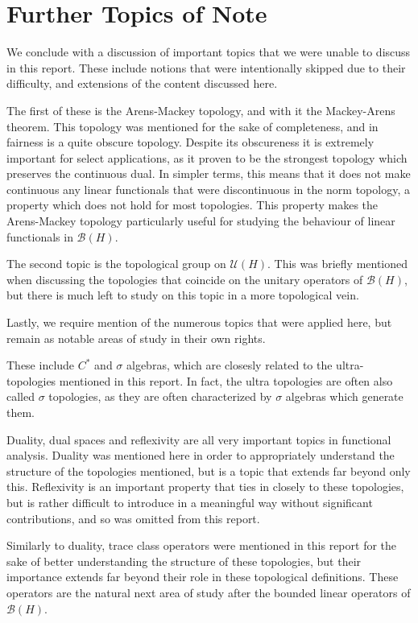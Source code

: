 \documentclass{article}
\theoremstyle{plain}
\theoremstyle{definition}
\newcommand{\BH}{\cal{B}(H)}
\renewcommand{\cal}[1]{\mathcal{#1}}
\begin{document}
\section{Further Topics of Note} \label{sec:proofs}

        We conclude with a discussion of important topics that we were unable to discuss in this report.
        These include notions that were intentionally skipped due to their difficulty, and extensions of the content discussed here.

        The first of these is the Arens-Mackey topology, and with it the Mackey-Arens theorem.
        This topology was mentioned for the sake of completeness, and in fairness is a quite obscure topology.
        Despite its obscureness it is extremely important for select applications, as it proven to be the strongest topology which preserves the continuous dual.
        In simpler terms, this means that it does not make continuous any linear functionals that were discontinuous in the norm topology, a property which does not hold for most topologies. 
        This property makes the Arens-Mackey topology particularly useful for studying the behaviour of linear functionals in $\BH$.

        The second topic is the topological group on $\cal{U}(H)$. This was briefly mentioned when discussing the topologies that coincide on the unitary operators of $\BH$, but there is much left to study on this topic in a more topological vein.

        Lastly, we require mention of the numerous topics that were applied here, but remain as notable areas of study in their own rights.
        
        These include $C^*$ and $\sigma$ algebras, which are closesly related to the ultra- topologies mentioned in this report. In fact, the ultra topologies are often also called $\sigma$ topologies, as they are often characterized by $\sigma$ algebras which generate them.

        Duality, dual spaces and reflexivity are all very important topics in functional analysis. 
        Duality was mentioned here in order to appropriately understand the structure of the topologies mentioned, but is a topic that extends far beyond only this.
        Reflexivity is an important property that ties in closely to these topologies, but is rather difficult to introduce in a meaningful way without significant contributions, and so was omitted from this report.

        Similarly to duality, trace class operators were mentioned in this report for the sake of better understanding the structure of these topologies, but their importance extends far beyond their role in these topological definitions. These operators are the natural next area of study after the bounded linear operators of $\BH$.


\newpage
\nocite{*}
\printbibliography
\end{document}
